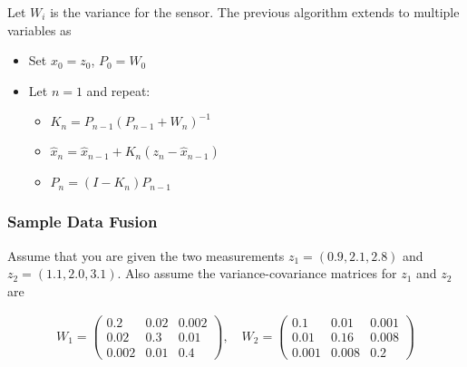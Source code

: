 Let \(W_i\) is the variance for the sensor. The previous algorithm
extends to multiple variables as

\begin{itemize}
\tightlist
\item
  Set \(x_0 = z_0\), \(P_0=W_0\)
\item
  Let \(n=1\) and repeat:

  \begin{itemize}
  \tightlist
  \item
    \(K_n = P_{n-1}\left(P_{n-1} + W_n\right)^{-1}\)
  \item
    \(\hat{x}_{n} =\hat{x}_{n-1} + K_n\left(z_n - \hat{x}_{n-1}\right)\)
  \item
    \(P_{n} = (I - K_n ) P_{n-1}\)
  \end{itemize}
\end{itemize}

\begin{Shaded}
\begin{Highlighting}[]
\OperatorTok{\textless{}}
\OperatorTok{=}\OperatorTok{{-}}
\OperatorTok{=}\OperatorTok{+}
\OperatorTok{=}\OperatorTok{*}
\OperatorTok{=}\OperatorTok{+}\OperatorTok{*}
\OperatorTok{=}\OperatorTok{{-}}\OperatorTok{*}
\OperatorTok{=}\OperatorTok{+}
\end{Highlighting}
\end{Shaded}

\hypertarget{sample-data-fusion}{%
\subsubsection{Sample Data Fusion}\label{sample-data-fusion}}

Assume that you are given the two measurements \(z_1 = (0.9, 2.1, 2.8)\)
and \(z_2 = (1.1, 2.0, 3.1)\). Also assume the variance-covariance
matrices for \(z_1\) and \(z_2\) are

\[\begin{aligned}
W_1 =
\begin{pmatrix}
0.2 & 0.02 & 0.002 \\
0.02 & 0.3 & 0.01 \\
0.002 & 0.01 & 0.4
\end{pmatrix},
\quad
W_2 =
\begin{pmatrix}
0.1 & 0.01 & 0.001 \\
0.01 & 0.16 & 0.008 \\
0.001 & 0.008 & 0.2
\end{pmatrix}
\end{aligned}\]

